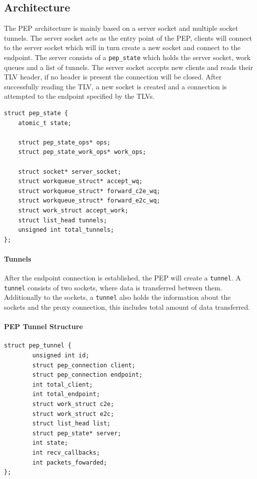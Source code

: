 \documentclass[a4paper,english, 11pt]{report}
\begin{document}
\subsection{Architecture}
The PEP architecture is mainly based on a server socket and multiple socket tunnels. The server socket acts as the entry point of the PEP, clients will connect to the server socket which will in turn create a new socket and connect to the endpoint. The server consists of a \verb|pep_state| which holds the server socket, work queues and a list of tunnels. The server socket accepts new clients and reads their TLV header, if no header is present the connection will be closed. After successfully reading the TLV, a new socket is created and a connection is attempted to the endpoint specified by the TLVs.\\

\noindent\begin{minipage}{\linewidth}
\begin{verbatim}
struct pep_state {
    atomic_t state;
    
    struct pep_state_ops* ops;
    struct pep_state_work_ops* work_ops;
    
    struct socket* server_socket;
    struct workqueue_struct* accept_wq;
    struct workqueue_struct* forward_c2e_wq;
    struct workqueue_struct* forward_e2c_wq;
    struct work_struct accept_work;
    struct list_head tunnels;
    unsigned int total_tunnels;
};
\end{verbatim}
\label{fig:pep_state_structure}
\end{minipage}

\paragraph{Tunnels}
After the endpoint connection is established, the PEP will create a \verb|tunnel|. A \verb|tunnel| consists of two sockets, where data is transferred between them. Additionally to the sockets, a \verb|tunnel| also holds the information about the sockets and the proxy connection, this includes total amount of data transferred.\\

\noindent\begin{minipage}{\linewidth}
\paragraph{PEP Tunnel Structure}
\begin{verbatim}
struct pep_tunnel {
        unsigned int id;
        struct pep_connection client;
        struct pep_connection endpoint;
        int total_client;
        int total_endpoint;
        struct work_struct c2e;
        struct work_struct e2c;
        struct list_head list;
        struct pep_state* server;
        int state;
        int recv_callbacks;
        int packets_fowarded;
};
\end{verbatim}
\end{minipage}
\end{document}
